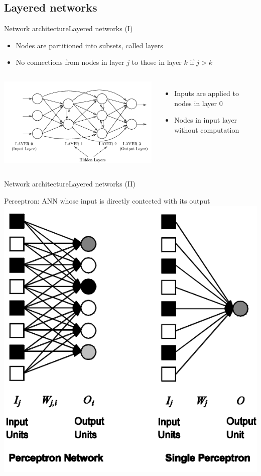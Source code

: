 \documentclass[10pt,compress]{beamer} %
\begin{document}
\subsection{Layered networks}
\begin{frame}{Network architecture}{Layered networks (I)}
		\begin{itemize}
		\item Nodes are partitioned into subsets, called layers
		\item No connections from nodes in layer $j$ to those in layer $k$ if $j > k$
		\end{itemize}

    \begin{columns}
	\centering\includegraphics[width=\linewidth]{figs/layered.png}
	   \begin{itemize}
	   \item Inputs are applied to nodes in layer 0
	   \item Nodes in input layer without computation
	   \end{itemize}
	   \end{columns}
\end{frame}

\begin{frame}{Network architecture}{Layered networks (II)}
	\begin{center}
	Perceptron: ANN whose input is directly contected with its output
	\includegraphics[width=0.5\linewidth]{figs/network.png}
	\end{center}
\end{frame}
\end{document}
